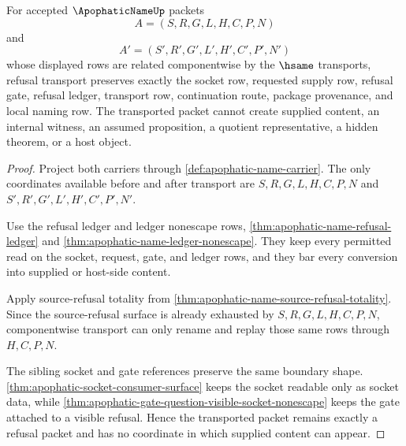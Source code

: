 \begin{theorem}
\label{thm:apophatic-name-refusal-transport-totality}
For accepted $\ApophaticNameUp$ packets
$$
A=(S,R,G,L,H,C,P,N)
$$
and
$$
A'=(S',R',G',L',H',C',P',N')
$$
whose displayed rows are related componentwise by the $\hsame$ transports, refusal transport preserves exactly the socket row, requested supply row, refusal gate, refusal ledger, transport row, continuation route, package provenance, and local naming row. The transported packet cannot create supplied content, an internal witness, an assumed proposition, a quotient representative, a hidden theorem, or a host object.
\end{theorem}
\begin{proof}
Project both carriers through \autoref{def:apophatic-name-carrier}. The only coordinates available before and after transport are $S,R,G,L,H,C,P,N$ and $S',R',G',L',H',C',P',N'$.

Use the refusal ledger and ledger nonescape rows, \autoref{thm:apophatic-name-refusal-ledger} and \autoref{thm:apophatic-name-ledger-nonescape}. They keep every permitted read on the socket, request, gate, and ledger rows, and they bar every conversion into supplied or host-side content.

Apply source-refusal totality from \autoref{thm:apophatic-name-source-refusal-totality}. Since the source-refusal surface is already exhausted by $S,R,G,L,H,C,P,N$, componentwise transport can only rename and replay those same rows through $H,C,P,N$.

The sibling socket and gate references preserve the same boundary shape. \autoref{thm:apophatic-socket-consumer-surface} keeps the socket readable only as socket data, while \autoref{thm:apophatic-gate-question-visible-socket-nonescape} keeps the gate attached to a visible refusal. Hence the transported packet remains exactly a refusal packet and has no coordinate in which supplied content can appear.
\end{proof}

